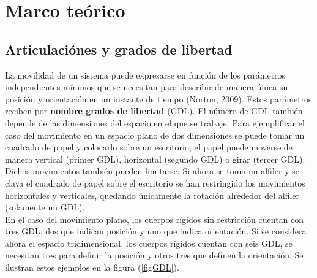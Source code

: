 

\chapter{Marco teórico}

\section{Articulaciónes y grados de libertad}

La movilidad de un sistema puede expresarse en función de los parámetros independientes mínimos que se necesitan para describir de manera única su posición y orientación en un instante de tiempo (Norton, 2009). Estos parámetros reciben por \textbf{nombre grados de libertad} (GDL). El número de GDL también depende de las dimensiones del espacio en el que se trabaje. Para ejemplificar el caso del movimiento en un espacio plano de dos dimensiones se puede tomar un cuadrado de papel y colocarlo sobre un escritorio, el papel puede moverse de manera vertical (primer GDL), horizontal (segundo GDL) o girar (tercer GDL). Dichos movimientos también pueden limitarse. Si ahora se toma un alfiler y se clava el cuadrado de papel sobre el escritorio se han restringido los movimientos horizontales y verticales, quedando únicamente la rotación alrededor del alfiler (solamente un GDL).
\\

En el caso del movimiento plano, los cuerpos rígidos sin restricción cuentan con tres
GDL, dos que indican posición y uno que indica orientación. Si se considera ahora el
espacio tridimensional, los cuerpos rígidos cuentan con seis GDL, se necesitan tres para
definir la posición y otros tres que definen la orientación. Se ilustran estos ejemplos en
la figura (\ref{figGDL}).

